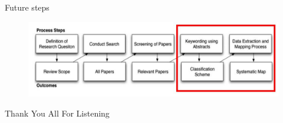 \documentclass{beamer}
\begin{document}
\begin{frame}{Future steps}
\begin{figure}
	\includegraphics[width=1.0\textwidth]{sms_part_marked_2}
\end{figure}
\end{frame}

\begin{frame}
  
\end{frame}

\begin{frame}
\begin{center}
	\huge{Thank You All For Listening}
\end{center}
\end{frame}
\end{document}
